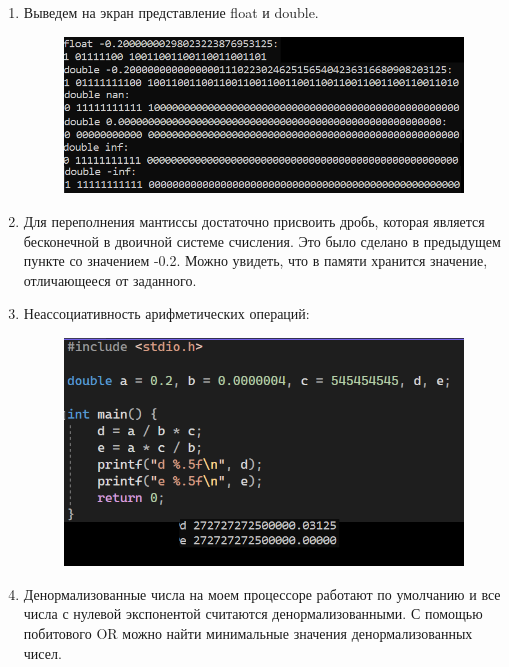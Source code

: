 \documentclass[a4paper,12pt]{article}
\begin{document}
\begin{enumerate}
\item Выведем на экран представление float и double.

\begin{figure}[H]
  \centering
  \includegraphics[width=1\linewidth]{images/asm4_3.png}
  \caption{}
\end{figure}

\item Для переполнения мантиссы достаточно присвоить дробь, которая является бесконечной в двоичной системе счисления. Это было сделано в предыдущем пункте со значением -0.2. Можно увидеть, что в памяти хранится значение, отличающееся от заданного.

\item Неассоциативность арифметических операций:

\begin{figure}[H]
  \centering
  \includegraphics[width=1\linewidth]{images/asm4_4.png}
  \caption{}
\end{figure}

\item Денормализованные числа на моем процессоре работают по умолчанию и все числа с нулевой экспонентой считаются денормализованными. С помощью побитового OR можно найти минимальные значения денормализованных чисел.


\end{enumerate}
\end{document}
